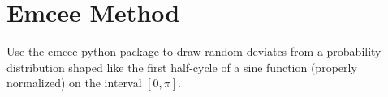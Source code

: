 \section{Emcee Method}

Use the emcee python package to draw random deviates from
a probability distribution shaped like the first half-cycle of a sine function (properly normalized)
on the interval $[0,\pi]$.